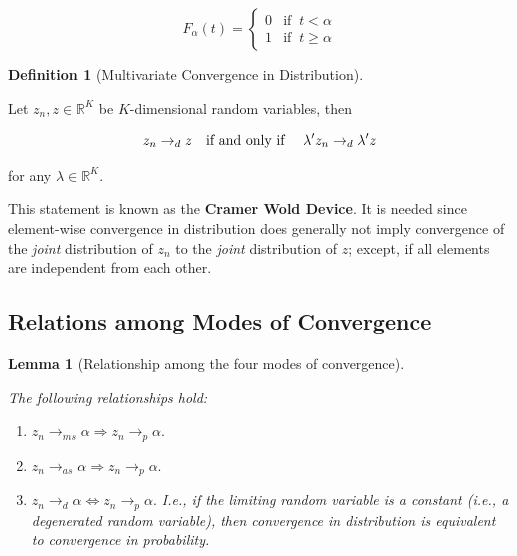 \documentclass[
  letterpaper,
  DIV=11,
  numbers=noendperiod]{scrreprt}
\providecommand{\tightlist}{%
  \setlength{\itemsep}{0pt}\setlength{\parskip}{0pt}}\usepackage{longtable,booktabs,array}
\theoremstyle{definition}
\newtheorem{definition}{Definition}[chapter]
\theoremstyle{plain}
\theoremstyle{plain}
\newtheorem{lemma}{Lemma}[chapter]
\theoremstyle{remark}
\begin{document}
\[
F_\alpha(t)=\left\{\begin{matrix}0&\text{if}\;\;t<\alpha\\ 1&\text{if}\;\;t\geq\alpha\end{matrix}\right.
\]

\leavevmode{}%
\begin{definition}[Multivariate Convergence in
Distribution]\label{def-conv_multdistr}

Let \(z_n,z\in\mathbb{R}^K\) be \(K\)-dimensional random variables, then

\[
z_n\to_{d} z\text{\quad if and only if \quad}\lambda'z_n\to_{d}\lambda'z
\]

for any \(\lambda\in\mathbb{R}^K\).

\end{definition}

This statement is known as the \textbf{Cramer Wold Device}. It is needed
since element-wise convergence in distribution does generally not imply
convergence of the \emph{joint} distribution of \(z_n\) to the
\emph{joint} distribution of \(z\); except, if all elements are
independent from each other.

\hypertarget{relations-among-modes-of-convergence}{%
\subsection*{Relations among Modes of
Convergence}\label{relations-among-modes-of-convergence}}

\leavevmode{}%
\begin{lemma}[Relationship among the four modes of
convergence]\label{lem-Relations}

The following relationships hold:

\begin{enumerate}
\def\labelenumi{(\roman{enumi})}
\tightlist
\item
  \(z_n\to_{ms}\alpha\Rightarrow z_n\to_{p}\alpha.\)
\item
  \(z_n\to_{as}\alpha\Rightarrow z_n\to_{p}\alpha.\)
\item
  \(z_n\to_{d}\alpha\Leftrightarrow z_n\to_{p}\alpha.\) I.e., if the
  limiting random variable is a constant (i.e., a degenerated random
  variable), then convergence in distribution is equivalent to
  convergence in probability.
\end{enumerate}

\end{lemma}
\end{document}
